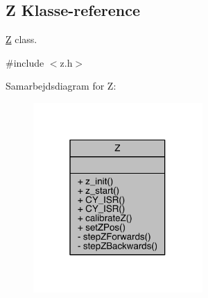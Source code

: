 \hypertarget{class_z}{}\subsection{Z Klasse-\/reference}
\label{class_z}


\hyperlink{class_z}{Z} class.  




{\ttfamily \#include $<$z.\+h$>$}



Samarbejdsdiagram for Z\+:
\nopagebreak
\begin{figure}[H]
\begin{center}
\leavevmode
\includegraphics[width=183pt]{d5/d58/class_z__coll__graph}
\end{center}
\end{figure}
